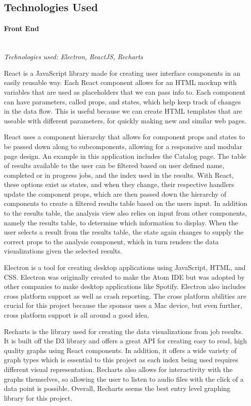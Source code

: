 \subsection{Technologies Used}

\paragraph{Front End} \mbox{} \\
\textit{Technologies used: Electron, ReactJS, Recharts}\par
React is a JavaScript library made for creating user interface components in an easily reusable way. Each React component allows for an HTML mockup with variables that are used as placeholders that we can pass info to. Each component can have parameters, called props, and states, which help keep track of changes in the data flow. This is useful because we can create HTML templates that are useable with different parameters, for quickly making new and similar web pages.\par
React uses a component hierarchy that allows for component props and states to be passed down along to subcomponents, allowing for a responsive and modular page design. An example in this application includes the Catalog page. The table of results available to the user can be filtered based on user defined name, completed or in progress jobs, and the index used in the results. With React, these options exist as states, and when they change, their respective handlers update the component props, which are then passed down the hierarchy of components to create a filtered results table based on the user\textquotesingle s input. In addition to the results table, the analysis view also relies on input from other components, namely the results table, to determine which information to display. When the user selects a result from the results table, the state again changes to supply the correct props to the analysis component, which in turn renders the data visualizations given the selected results.\par
Electron is a tool for creating desktop applications using JavaScript, HTML, and CSS. Electron was originally created to make the Atom IDE but was adopted by other companies to make desktop applications like Spotify. Electron also includes cross platform support as well as crash reporting. The cross platform abilities are crucial for this project because the sponsor uses a Mac device, but even further, cross platform support is all around a good idea.\par
Recharts is the library used for creating the data visualizations from job results. It is built off the D3 library and offers a great API for creating easy to read, high quality graphs using React components. In addition, it offers a wide variety of graph types which is essential to this project as each index being used requires different visual representation. Recharts also allows for interactivity with the graphs themselves, so allowing the user to listen to audio files with the click of a data point is possible. Overall, Recharts seems the best entry level graphing library for this project.\par

